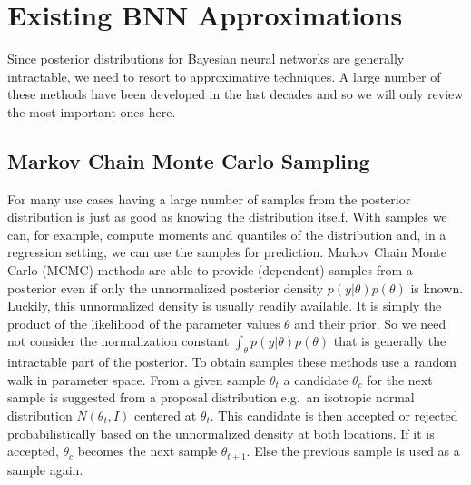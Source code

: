 \documentclass[../thesis.tex]{subfiles}
\begin{document}
\section{Existing BNN Approximations}
Since posterior distributions for Bayesian neural networks are generally intractable, we need to resort to approximative techniques. A large number of these methods have been developed in the last decades and so we will only review the most important ones here.

\subsection{Markov Chain Monte Carlo Sampling}
For many use cases having a large number of samples from the posterior distribution is just as good as knowing the distribution itself. With samples we can, for example, compute moments and quantiles of the distribution and, in a regression setting, we can use the samples for prediction. Markov Chain Monte Carlo (MCMC) methods are able to provide (dependent) samples from a posterior even if only the unnormalized posterior density $p(y|\theta)p(\theta)$ is known. Luckily, this unnormalized density is usually readily available. It is simply the product of the likelihood of the parameter values $\theta$ and their prior. So we need not consider the normalization constant $\int_{\theta} p(y|\theta)p(\theta)$ that is generally the intractable part of the posterior. To obtain samples these methods use a random walk in parameter space. From a given sample $\theta_t$ a candidate $\theta_{c}$ for the next sample is suggested from a proposal distribution e.g.\ an isotropic normal distribution $N(\theta_t, I)$ centered at $\theta_t$. This candidate is then accepted or rejected probabilistically based on the unnormalized density at both locations. If it is accepted, $\theta_{c}$ becomes the next sample $\theta_{t+1}$. Else the previous sample is used as a sample again.
\end{document}
